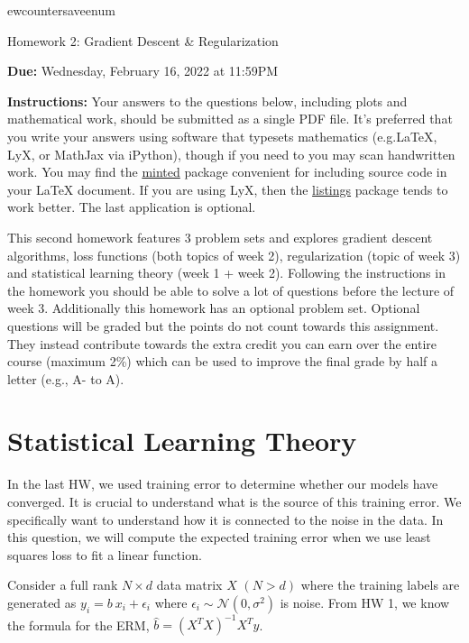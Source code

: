 \documentclass{article}
\begin{document}
ewcounter{saveenum}

\pagestyle{myheadings} 

\begin{center}
{\Large
Homework 2: Gradient Descent \& Regularization
} 
\end{center}

{
{ \color{nyupurple} \textbf{Due:} Wednesday, February 16, 2022 at 11:59PM} 
} 

\textbf{Instructions: }Your answers to the questions below, including plots and mathematical
 work, should be submitted as a single PDF file.  It's preferred that you write your answers using software that typesets mathematics (e.g.LaTeX, LyX, or MathJax via iPython), though if you need to you may scan handwritten work.  You may find the \href{https://github.com/gpoore/minted}{minted} package convenient for including source code in your LaTeX document.  If you are using LyX, then the \href{https://en.wikibooks.org/wiki/LaTeX/Source_Code_Listings}{listings} package tends to work better. The last application is optional.


This second homework features 3 problem sets and explores gradient descent algorithms, loss functions (both topics of week 2), regularization (topic of week 3) and statistical learning theory (week 1 + week 2). Following the instructions in the homework you should be able to solve a lot of questions before the lecture of week 3. Additionally this homework has an optional problem set. Optional questions will be graded but the points do not count towards this assignment. They instead contribute towards the extra credit you can earn over the entire course (maximum 2\%) which can be used to improve the final grade by half a letter (e.g., A- to A). 

\section{\large Statistical Learning Theory}
In the last HW, we used training error to determine whether our models have converged. It is crucial to understand what is the source of this training error. We specifically want to understand how it is connected to the noise in the data. In this question, we will compute the expected training error when we use least squares loss to fit a linear function. 

Consider a full rank $N \times d$ data matrix $X$ $(N > d)$ where the training labels are generated as $y_i = b \: x_i + \epsilon_i$ where $\epsilon_i \sim \mathcal{N}(0, \sigma^2)$ is noise. From HW 1, we know the formula for the ERM, $\hat{b} = (X^TX)^{-1}X^Ty$.
\end{document}
